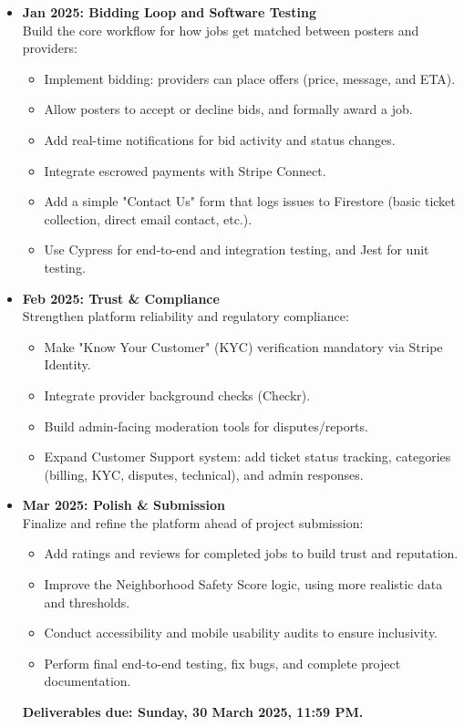 \documentclass[11pt]{article}
\begin{document}
\begin{itemize}[leftmargin=1.4em]
\begin{itemize}
  \end{itemize}
  \item \textbf{Jan 2025: Bidding Loop and Software Testing} \\
  Build the core workflow for how jobs get matched between posters and providers:
  \begin{itemize}
    \item Implement bidding: providers can place offers (price, message, and ETA).
    \item Allow posters to accept or decline bids, and formally award a job.
    \item Add real-time notifications for bid activity and status changes.
    \item Integrate escrowed payments with Stripe Connect.
    \item Add a simple "Contact Us" form that logs issues to Firestore (basic ticket collection, direct email contact, etc.).
    \item Use Cypress for end-to-end and integration testing, and Jest for unit testing.
  \end{itemize}
  \item \textbf{Feb 2025: Trust \& Compliance} \\
    Strengthen platform reliability and regulatory compliance:
    \begin{itemize}
      \item Make "Know Your Customer" (KYC) verification mandatory via Stripe Identity.
      \item Integrate provider background checks (Checkr).
      \item Build admin-facing moderation tools for disputes/reports.
      \item Expand Customer Support system: add ticket status tracking, categories (billing, KYC, disputes, technical), and admin responses.
    \end{itemize}
  \item \textbf{Mar 2025: Polish \& Submission} \\
    Finalize and refine the platform ahead of project submission:
    \begin{itemize}
      \item Add ratings and reviews for completed jobs to build trust and reputation.
      \item Improve the Neighborhood Safety Score logic, using more realistic data and thresholds.
      \item Conduct accessibility and mobile usability audits to ensure inclusivity.
      \item Perform final end-to-end testing, fix bugs, and complete project documentation.
    \end{itemize}
  \textbf{Deliverables due: Sunday, 30 March 2025, 11:59 PM.}
\end{itemize}
\end{document}
